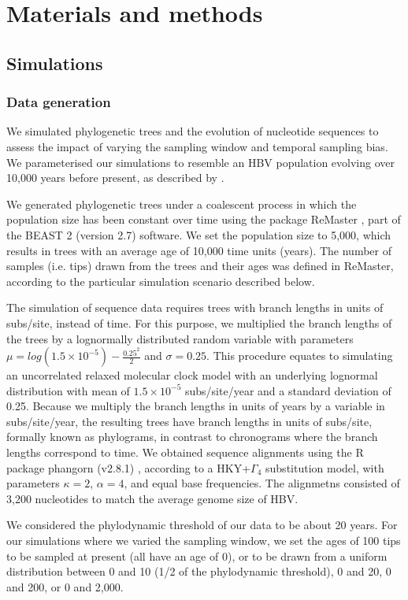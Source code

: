 \documentclass[11pt]{article}
\begin{document}
\section{Materials and methods}
\subsection{Simulations}
\subsubsection{Data generation}
We simulated phylogenetic trees and the evolution of nucleotide sequences to assess the impact of varying the sampling window and temporal sampling bias. We parameterised our simulations to resemble an HBV population evolving over 10,000 years before present, as described by \cite{kocher2021ten}. 

We generated phylogenetic trees under a coalescent process in which the population size has been constant over time using the package ReMaster \citep{vaughan2024remaster}, part of the BEAST 2 (version 2.7) software. We set the population size to 5,000, which results in trees with an average age of 10,000 time units (years). The number of samples (i.e. tips) drawn from the trees and their ages was defined in ReMaster, according to the particular simulation scenario described below.

The simulation of sequence data requires trees with branch lengths in units of subs/site, instead of time. For this purpose, we multiplied the branch lengths of the trees by a lognormally distributed random variable with parameters $\mu=log(1.5\times10^{-5}) - \frac{0.25^2}{2}$ and $\sigma=0.25$. This procedure equates to simulating an uncorrelated relaxed molecular clock model with an underlying lognormal distribution \citep{drummond2006relaxed} with mean of $1.5\times10^{-5}$ subs/site/year and a standard deviation of 0.25. Because we multiply the branch lengths in units of years by a variable in subs/site/year, the resulting trees have branch lengths in units of subs/site, formally known as phylograms, in contrast to chronograms where the branch lengths correspond to time.   We obtained sequence alignments using the R package phangorn (v2.8.1) \citep{schliep2011phangorn}, according to a HKY+$\Gamma_4$ substitution model, with parameters $\kappa=2$, $\alpha=4$, and equal base frequencies. The alignmetns consisted of 3,200 nucleotides to match the average genome size of HBV.

We considered the phylodynamic threshold of our data to be about 20 years. For our simulations where we varied the sampling window, we set the ages of 100 tips to be sampled at present (all have an age of 0), or to be drawn from a uniform distribution between 0 and 10 (1/2 of the phylodynamic threshold), 0 and 20, 0 and 200, or 0 and 2,000. 
\end{document}
